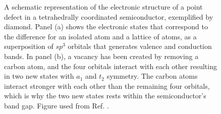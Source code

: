 \begin{figure}[ht!]
\begin{subfigure}{1.0\linewidth}
\subcaption{} \label{fig:defect diamond structure}
\end{subfigure}
\par\bigskip
\caption{A schematic representation of the electronic structure of a point defect in a tetrahedrally coordinated semiconductor, exemplified by diamond. Panel (a) shows the electronic states that correspond to the difference for an isolated atom and a lattice of atoms, as a superposition of $sp^3$ orbitals that generates valence and conduction bands. In panel (b), a vacancy has been created by removing a carbon atom, and the four orbitals interact with each other resulting in two new states with $a_1$ and $t_2$ symmetry. The carbon atoms interact stronger with each other than the remaining four orbitals, which is why the two new states rests within the semiconductor's band gap. Figure used from Ref. \cite{Gordon2013}.}
\label{fig: diamond electronic structure}
\end{figure}
